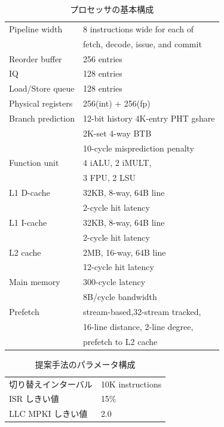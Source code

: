 \documentclass[twocolumn]{jsarticle}
\begin{document}
  \begin{table}[htb]
    \caption{プロセッサの基本構成}
    \footnotesize
    \center
      \begin{tabular}{l|l} \hline \hline
       Pipeline width & 8 instructions wide for each of \\
       & fetch, decode, issue, and commit \\
       Reorder buffer & 256 entries \\
       IQ & 128 entries \\
       Load/Store queue & 128 entries \\
       Physical registers & 256(int) + 256(fp) \\
       Branch prediction & 12-bit history 4K-entry PHT gshare \\
       & 2K-set 4-way BTB \\
       & 10-cycle misprediction penalty \\
       Function unit & 4 iALU, 2 iMULT, \\
       &  3 FPU, 2 LSU \\
       L1 D-cache & 32KB, 8-way, 64B line \\
        & 2-cycle hit latency \\
       L1 I-cache & 32KB, 8-way, 64B line \\
        &  2-cycle hit latency \\
       L2 cache & 2MB, 16-way, 64B line \\
        & 12-cycle hit latency \\  
       Main memory & 300-cycle latency \\
       & 8B/cycle bandwidth \\ 
       Prefetch & stream-based,32-stream tracked,  \\ 
       & 16-line distance, 2-line degree, \\
       & prefetch to L2 cache \\ \hline
    \end{tabular}
    \label{tab:base_config}
  \end{table}

\begin{table}[htb]
  \caption{提案手法のパラメータ構成}
  \footnotesize
  \center
    \begin{tabular}{l|l} \hline \hline
    切り替えインターバル & 10K instructions \\
    ISR しきい値 & 15\% \\
    LLC MPKI しきい値 & 2.0 \\ \hline 
  \end{tabular}
  \label{tab:segmentedIQ_config}
\end{table}
\end{document}
